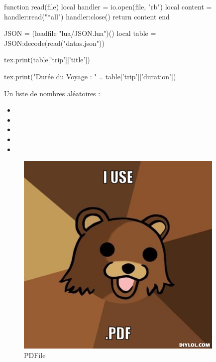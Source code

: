 \documentclass{article}
\begin{document}
\begin{luacode}

function read(file)
    local handler = io.open(file, "rb")
    local content = handler:read("*all")
    handler:close()
    return content
end

JSON = (loadfile "lua/JSON.lua")()
local table = JSON:decode(read("datas.json"))

tex.print(table['trip']['title'])

tex.print("Durée du Voyage : " .. table['trip']['duration'])

\end{luacode}

    Un liste de nombres aléatoires :
    \begin{itemize}
        \item {}
        \item {}
        \item {}
        \item {}
        \item {}
    \end{itemize}

    \begin{figure}[h]
        \includegraphics[width=10cm]{pdf.jpg}
        \centering
        \caption{PDFile}
        \label{PDFile}
    \end{figure}
\end{document}
